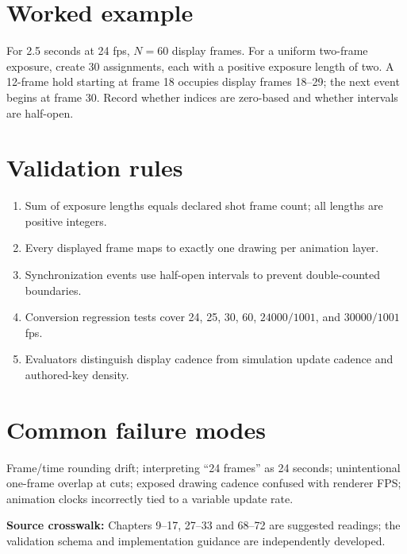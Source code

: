 \documentclass[10pt,letterpaper]{article}
\begin{document}
\section{Worked example}
For 2.5 seconds at 24 fps, $N=60$ display frames. For a uniform two-frame exposure, create 30 assignments, each with a positive exposure length of two. A 12-frame hold starting at frame 18 occupies display frames 18--29; the next event begins at frame 30. Record whether indices are zero-based and whether intervals are half-open.
\section{Validation rules}
\begin{enumerate}
\item Sum of exposure lengths equals declared shot frame count; all lengths are positive integers.
\item Every displayed frame maps to exactly one drawing per animation layer.
\item Synchronization events use half-open intervals to prevent double-counted boundaries.
\item Conversion regression tests cover 24, 25, 30, 60, $24000/1001$, and $30000/1001$ fps.
\item Evaluators distinguish display cadence from simulation update cadence and authored-key density.
\end{enumerate}
\section{Common failure modes}
Frame/time rounding drift; interpreting ``24 frames'' as 24 seconds; unintentional one-frame overlap at cuts; exposed drawing cadence confused with renderer FPS; animation clocks incorrectly tied to a variable update rate.\par
\textbf{Source crosswalk:} Chapters 9--17, 27--33 and 68--72 are suggested readings; the validation schema and implementation guidance are independently developed.
\end{document}
